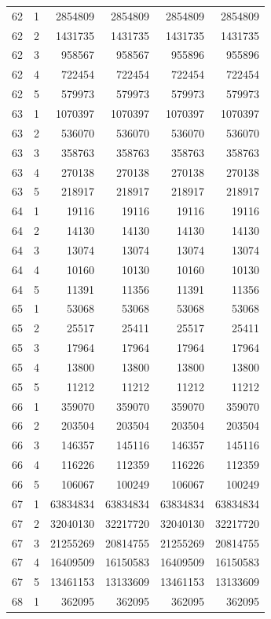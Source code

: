 \begin{longtable}{rrrrrr}
62 & 1 & 2854809 & 2854809 & 2854809 & 2854809 \\
62 & 2 & 1431735 & 1431735 & 1431735 & 1431735 \\
62 & 3 & 958567 & 958567 & 955896 & 955896 \\
62 & 4 & 722454 & 722454 & 722454 & 722454 \\
62 & 5 & 579973 & 579973 & 579973 & 579973 \\
63 & 1 & 1070397 & 1070397 & 1070397 & 1070397 \\
63 & 2 & 536070 & 536070 & 536070 & 536070 \\
63 & 3 & 358763 & 358763 & 358763 & 358763 \\
63 & 4 & 270138 & 270138 & 270138 & 270138 \\
63 & 5 & 218917 & 218917 & 218917 & 218917 \\
64 & 1 & 19116 & 19116 & 19116 & 19116 \\
64 & 2 & 14130 & 14130 & 14130 & 14130 \\
64 & 3 & 13074 & 13074 & 13074 & 13074 \\
64 & 4 & 10160 & 10130 & 10160 & 10130 \\
64 & 5 & 11391 & 11356 & 11391 & 11356 \\
65 & 1 & 53068 & 53068 & 53068 & 53068 \\
65 & 2 & 25517 & 25411 & 25517 & 25411 \\
65 & 3 & 17964 & 17964 & 17964 & 17964 \\
65 & 4 & 13800 & 13800 & 13800 & 13800 \\
65 & 5 & 11212 & 11212 & 11212 & 11212 \\
66 & 1 & 359070 & 359070 & 359070 & 359070 \\
66 & 2 & 203504 & 203504 & 203504 & 203504 \\
66 & 3 & 146357 & 145116 & 146357 & 145116 \\
66 & 4 & 116226 & 112359 & 116226 & 112359 \\
66 & 5 & 106067 & 100249 & 106067 & 100249 \\
67 & 1 & 63834834 & 63834834 & 63834834 & 63834834 \\
67 & 2 & 32040130 & 32217720 & 32040130 & 32217720 \\
67 & 3 & 21255269 & 20814755 & 21255269 & 20814755 \\
67 & 4 & 16409509 & 16150583 & 16409509 & 16150583 \\
67 & 5 & 13461153 & 13133609 & 13461153 & 13133609 \\
68 & 1 & 362095 & 362095 & 362095 & 362095 \\

\end{longtable}
